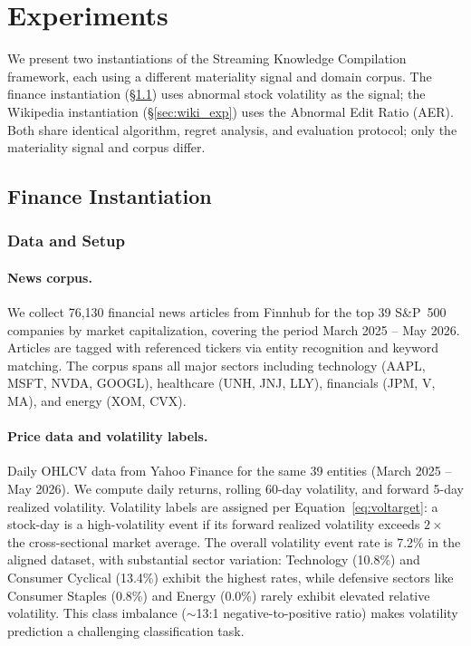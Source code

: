 \documentclass{article}
\begin{document}
\section{Experiments}
\label{sec:experiments}

We present two instantiations of the Streaming Knowledge Compilation framework, each using a different materiality signal and domain corpus.
The finance instantiation (\S\ref{sec:finance_exp}) uses abnormal stock volatility as the signal; the Wikipedia instantiation (\S\ref{sec:wiki_exp}) uses the Abnormal Edit Ratio (AER).
Both share identical algorithm, regret analysis, and evaluation protocol; only the materiality signal and corpus differ.

\subsection{Finance Instantiation}
\label{sec:finance_exp}

\subsubsection{Data and Setup}

\paragraph{News corpus.}
We collect 76,130 financial news articles from Finnhub for the top 39 S\&P~500 companies by market capitalization, covering the period March 2025 -- May 2026.
Articles are tagged with referenced tickers via entity recognition and keyword matching.
The corpus spans all major sectors including technology (AAPL, MSFT, NVDA, GOOGL), healthcare (UNH, JNJ, LLY), financials (JPM, V, MA), and energy (XOM, CVX).

\paragraph{Price data and volatility labels.}
Daily OHLCV data from Yahoo Finance for the same 39 entities (March 2025 -- May 2026).
We compute daily returns, rolling 60-day volatility, and forward 5-day realized volatility.
Volatility labels are assigned per Equation~\eqref{eq:voltarget}: a stock-day is a high-volatility event if its forward realized volatility exceeds $2\times$ the cross-sectional market average.
The overall volatility event rate is 7.2\% in the aligned dataset, with substantial sector variation: Technology (10.8\%) and Consumer Cyclical (13.4\%) exhibit the highest rates, while defensive sectors like Consumer Staples (0.8\%) and Energy (0.0\%) rarely exhibit elevated relative volatility.
This class imbalance ($\sim$13:1 negative-to-positive ratio) makes volatility prediction a challenging classification task.
\end{document}
